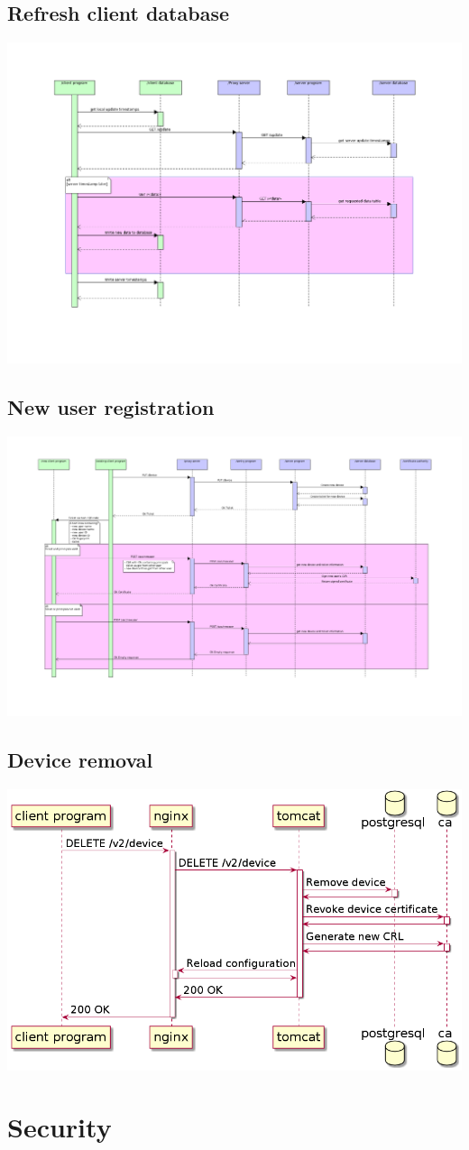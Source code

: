 \documentclass[12pt]{report}
\begin{document}
\subsection{Refresh client database}

\includegraphics[width=\linewidth]{diagrams/Refreshment.png}

\subsection{New user registration}

\includegraphics[width=\linewidth]{diagrams/new-user-registration.png}

\subsection{Device removal}

\includegraphics[width=\linewidth]{diagrams/remove-device.png}

\section{Security}
\end{document}
